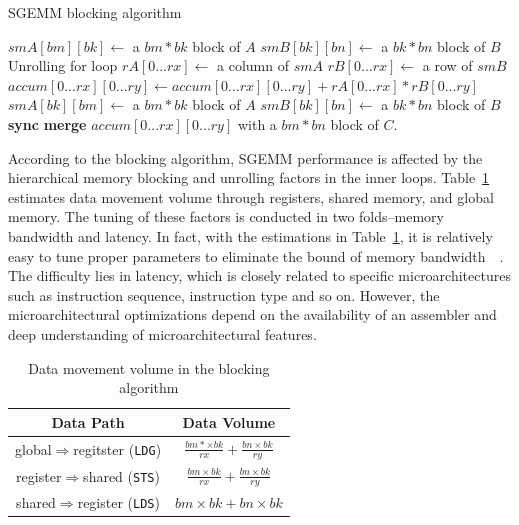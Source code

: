 \documentclass{sig-alternate-05-2015}
\begin{document}
\begin{algorithm}
  \caption{SGEMM blocking algorithm}\label{gemm}
  \begin{algorithmic}[1]
	\State $smA[bm][bk] \gets$ a $bm * bk$ block of $A$
	\State $smB[bk][bn] \gets$ a $bk * bn$ block of $B$
	\Do
	 \Comment Unrolling for loop
	\State $rA[0...rx]\gets$ a column of $smA$
	\State $rB[0...rx]\gets$ a row of $smB$
	\State $accum[0...rx][0...ry]\gets accum[0...rx][0...ry]+rA[0...rx]*rB[0...ry]$
	\EndFor
	\State $smA[bk][bm]\gets$ a $bm*bk$ block of $A$
	\State $smB[bk][bn]\gets$ a $bk*bn$ block of $B$
	\State \textbf{sync}
	\State \textbf{merge} $accum[0...rx][0...ry]$ with a $bm*bn$ block of $C$.
  \end{algorithmic}
\end{algorithm}

According to the blocking algorithm, SGEMM performance is affected by the hierarchical memory blocking and unrolling factors in the inner loops. Table~\ref{tab:reg} estimates data movement volume through registers, shared memory, and global memory. The tuning of these factors is conducted in two folds--memory bandwidth and latency. In fact, with the estimations in Table~\ref{tab:reg}, it is relatively easy to tune proper parameters to eliminate the bound of memory bandwidth~\cite{magma}~\cite{tan}. The difficulty lies in latency, which is closely related to specific microarchitectures such as instruction sequence, instruction type and so on. However, the microarchitectural optimizations depend on the availability of an assembler and deep understanding of microarchitectural features. %

\begin{table}[!t]
\caption{Data movement volume in the blocking algorithm}
\centering
\scalebox{1.0} {
\begin{tabular}{|c||c|}
\hline
Data Path& Data Volume\\
\hline
global$\Rightarrow$regitster ({\tt LDG})& $\frac{bm*\times bk}{rx} + \frac{bn\times bk}{ry}$\\
\hline
register$\Rightarrow$shared ({\tt STS})& $\frac{bm\times bk}{rx} + \frac{bn\times bk}{ry}$\\
\hline
shared$\Rightarrow$register ({\tt LDS})& $bm\times bk + bn\times bk$\\
\hline
\end{tabular}
}
\label{tab:reg}
\end{table}
\end{document}
